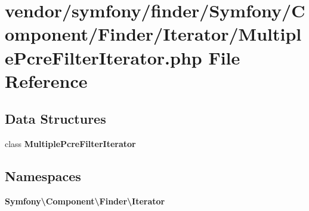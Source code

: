 \section{vendor/symfony/finder/\+Symfony/\+Component/\+Finder/\+Iterator/\+Multiple\+Pcre\+Filter\+Iterator.php File Reference}
\label{_multiple_pcre_filter_iterator_8php}
\subsection*{Data Structures}
\begin{DoxyCompactItemize}
\item 
class {\bf Multiple\+Pcre\+Filter\+Iterator}
\end{DoxyCompactItemize}
\subsection*{Namespaces}
\begin{DoxyCompactItemize}
\item 
 {\bf Symfony\textbackslash{}\+Component\textbackslash{}\+Finder\textbackslash{}\+Iterator}
\end{DoxyCompactItemize}
